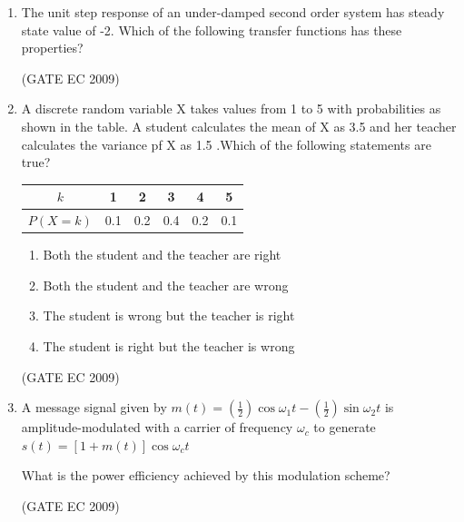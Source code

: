\documentclass[journal,12pt,onecolumn]{IEEEtran}
\theoremstyle{remark}
\begin{document}
\begin{enumerate}[start=1, label={Q\arabic*.}]
\item The unit step response of an under-damped second order system has steady state value of -2. Which of the following transfer functions has these properties?
\begin{enumerate}[label=(\Alph*)]
\end{enumerate}
\hfill (GATE EC 2009)

\item A discrete random variable X takes values from 1 to 5 with probabilities as shown in the table. A student calculates the mean of X as 3.5 and her teacher calculates the variance pf X as 1.5 .Which of the following statements are true?
\begin{center}
\begin{tabular}{|c|c|c|c|c|c|}
\hline
$k$ & 1 & 2 & 3 & 4 & 5 \\
\hline
$P(X = k)$ & 0.1 & 0.2 & 0.4 & 0.2 & 0.1 \\
\hline
\end{tabular}
\end{center}
\begin{enumerate}[label=(\Alph*)]
        \item Both the student and the teacher are right
        \item Both the student and the teacher are wrong
        \item The student is wrong but the teacher is right 
        \item The student is right but the teacher is wrong
\end{enumerate}
\hfill (GATE EC 2009)

\item A message signal given by $m(t)=(\frac{1}{2})\cos{\omega_1t}-(\frac{1}{2})\sin{\omega_2t}$   is amplitude-modulated with a carrier of frequency $\omega_c$ to generate $s(t)=[1+m(t)]\cos\omega_ct$ 

What is the power efficiency achieved by this modulation scheme?
\begin{enumerate}[label=(\Alph*)]
\end{enumerate}
\hfill (GATE EC 2009)


\end{enumerate}
\end{document}
